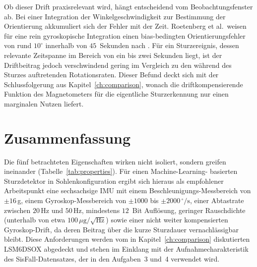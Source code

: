 \documentclass[11pt,a4paper,oneside]{report}
\begin{document}
Ob dieser Drift praxisrelevant wird, hängt entscheidend vom
Beobachtungsfenster ab. Bei einer Integration der Winkelgeschwindigkeit zur
Bestimmung der Orientierung akkumuliert sich der Fehler mit der Zeit.
Roetenberg et al.\ weisen für eine rein gyroskopische Integration einen
bias-bedingten Orientierungsfehler von rund $10^{\circ}$ innerhalb von
$45$~Sekunden nach \cite{roetenberg2005}. Für ein Sturzereignis, dessen
relevante Zeitspanne im Bereich von ein bis zwei Sekunden liegt, ist der
Driftbeitrag jedoch verschwindend gering im Vergleich zu den während
des Sturzes auftretenden Rotationsraten. Dieser Befund deckt sich mit der
Schlussfolgerung aus Kapitel~\ref{ch:comparison}, wonach die
driftkompensierende Funktion des Magnetometers für die eigentliche
Sturzerkennung nur einen marginalen Nutzen liefert.

\section{Zusammenfassung}
\label{sec:synthesis}
Die fünf betrachteten Eigenschaften wirken nicht isoliert, sondern greifen
ineinander (Tabelle~\ref{tab:properties}). Für einen Machine-Learning-
basierten Sturzdetektor in Sohlenkonfiguration ergibt sich hieraus als
empfohlener Arbeitspunkt eine sechsachsige \ac{IMU} mit einem
Beschleunigungs-Messbereich von $\pm 16$\,g, einem Gyroskop-Messbereich
von $\pm 1000$ bis $\pm 2000\,^{\circ}/\mathrm{s}$, einer Abtastrate
zwischen $20$\,Hz und $50$\,Hz, mindestens $12$~Bit Auflösung, geringer
Rauschdichte (unterhalb von etwa
$100\,\mu\mathrm{g}/\sqrt{\mathrm{Hz}}$) sowie einer nicht weiter
kompensierten Gyroskop-Drift, da deren Beitrag über die kurze
Sturzdauer vernachlässigbar bleibt. Diese Anforderungen werden vom in
Kapitel~\ref{ch:comparison} diskutierten LSM6DSOX abgedeckt und stehen im
Einklang mit der Aufnahmecharakteristik des SisFall-Datensatzes, der in
den Aufgaben~3 und~4 verwendet wird.
\end{document}
